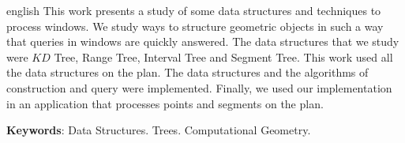 \begin{resumo}[Abstract]
	\SingleSpacing
	\begin{otherlanguage*}{english}
		This work presents a study of some data structures and techniques to process windows. We study ways to structure geometric objects in such a way that queries in windows are quickly answered. The data structures that we study were $KD$ Tree, Range Tree, Interval Tree and Segment Tree. This work used all the data structures on the plan. The data structures and the algorithms of construction and query were implemented. Finally, we used our implementation in an application that processes points and segments on the plan.  %

		\textbf{Keywords}: Data Structures. Trees. Computational Geometry.
	\end{otherlanguage*}
\end{resumo}



\listoffigures*
\cleardoublepage

\listoftables*
\cleardoublepage



\tableofcontents*
\cleardoublepage

